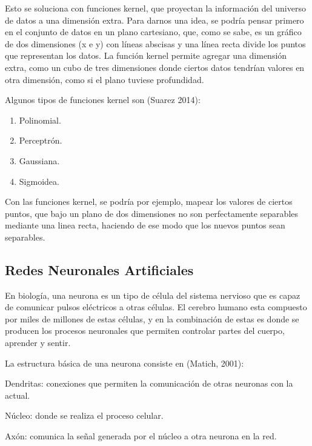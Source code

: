 \documentclass[a4paper,12pt,oneside,spanish]{book}
\begin{document}
Esto se soluciona con funciones kernel, que proyectan la información del universo de datos a una dimensión extra. Para darnos una idea, se podría pensar primero en el conjunto de datos en un plano cartesiano, que, como se sabe, es un gráfico de dos dimensiones (x e y) con líneas abscisas y una línea recta divide los puntos que representan los datos. La función kernel permite agregar una dimensión extra, como un cubo de tres dimensiones donde ciertos datos tendrían valores en otra dimensión, como si el plano tuviese profundidad. \par

Algunos tipos de funciones kernel son (Suarez 2014): \par

\begin{enumerate}[noitemsep]
	\item Polinomial.
	\item Perceptrón.
	\item Gaussiana.
	\item Sigmoidea.
\end{enumerate}

Con las funciones kernel, se podría por ejemplo, mapear los valores de ciertos puntos, que bajo un plano de dos dimensiones no son perfectamente separables mediante una linea recta, haciendo de ese modo que los nuevos puntos sean separables.

\subsection{Redes Neuronales Artificiales}

En biología, una neurona es un tipo de célula del sistema nervioso que es capaz de comunicar pulsos eléctricos a otras células. El cerebro humano esta compuesto por miles de millones de estas células, y en la combinación de estas es donde se producen los procesos neuronales que permiten controlar partes del cuerpo, aprender y sentir. \par

La estructura básica de una neurona consiste en (Matich, 2001):
\begin{compactitem}
	\item Dendritas: conexiones que permiten la comunicación de otras neuronas con la actual.
	\item Núcleo: donde se realiza el proceso celular.
	\item Axón: comunica la señal generada por el núcleo a otra neurona en la red.
\end{compactitem}
\end{document}
